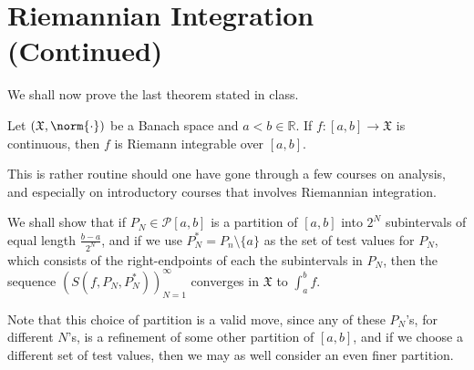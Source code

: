 \documentclass[notoc,notitlepage]{tufte-book}
\begin{document}
\section{Riemannian Integration (Continued)}%
\label{sec:riemannian_integration_continued}

We shall now prove the last theorem stated in class.

\begin{thm}\label{thmnonum:continuous_functions_are_riemann_integrable}
  Let $(\mathfrak{X}, \norm{\cdot})$ be a Banach space and $a < b \in
  \mathbb{R}$. If $f : [a, b] \to \mathfrak{X}$ is continuous, then $f$ is
  Riemann integrable over $[a, b]$.
\end{thm}

\begin{strategy}
  This is rather routine should one have gone through a few courses on analysis,
  and especially on introductory courses that involves Riemannian integration.

  We shall show that if $P_N \in \mathcal{P}[a, b]$ is a partition of $[a, b]$ 
  into $2^N$ subintervals of equal length $\frac{b - a}{2^N}$, and if we use
  $P_N^* = P_n \setminus \{ a \}$ as the set of test values for $P_N$, which
  consists of the right-endpoints of each the subintervals in $P_N$, then the
  sequence $(S(f, P_N, P_N^*))_{N = 1}^{\infty}$ converges in $\mathfrak{X}$ to
  $\int_{a}^{b} f$.

  Note that this choice of partition is a valid move, since any of these
  $P_N$'s, for different $N$'s, is a refinement of some other partition of $[a,
  b]$, and if we choose a different set of test values, then we may as well
  consider an even finer partition.
\end{strategy}
\end{document}

